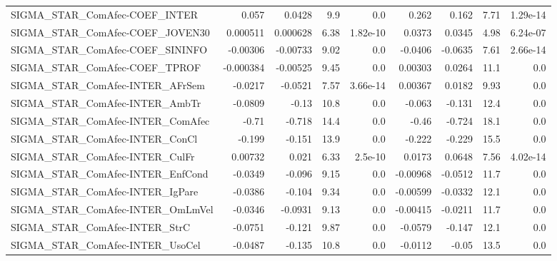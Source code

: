 \begin{tabular}{lrrrrrrrr}
SIGMA\_STAR\_ComAfec-COEF\_INTER          &       0.057 &       0.0428 &      9.9 &      0.0 &      0.262 &       0.162 &         7.71 &      1.29e-14 \\
SIGMA\_STAR\_ComAfec-COEF\_JOVEN30        &    0.000511 &     0.000628 &     6.38 & 1.82e-10 &     0.0373 &      0.0345 &         4.98 &      6.24e-07 \\
SIGMA\_STAR\_ComAfec-COEF\_SININFO        &    -0.00306 &     -0.00733 &     9.02 &      0.0 &    -0.0406 &     -0.0635 &         7.61 &      2.66e-14 \\
SIGMA\_STAR\_ComAfec-COEF\_TPROF          &   -0.000384 &     -0.00525 &     9.45 &      0.0 &    0.00303 &      0.0264 &         11.1 &           0.0 \\
SIGMA\_STAR\_ComAfec-INTER\_AFrSem        &     -0.0217 &      -0.0521 &     7.57 & 3.66e-14 &    0.00367 &      0.0182 &         9.93 &           0.0 \\
SIGMA\_STAR\_ComAfec-INTER\_AmbTr         &     -0.0809 &        -0.13 &     10.8 &      0.0 &     -0.063 &      -0.131 &         12.4 &           0.0 \\
SIGMA\_STAR\_ComAfec-INTER\_ComAfec       &       -0.71 &       -0.718 &     14.4 &      0.0 &      -0.46 &      -0.724 &         18.1 &           0.0 \\
SIGMA\_STAR\_ComAfec-INTER\_ConCl         &      -0.199 &       -0.151 &     13.9 &      0.0 &     -0.222 &      -0.229 &         15.5 &           0.0 \\
SIGMA\_STAR\_ComAfec-INTER\_CulFr         &     0.00732 &        0.021 &     6.33 &  2.5e-10 &     0.0173 &      0.0648 &         7.56 &      4.02e-14 \\
SIGMA\_STAR\_ComAfec-INTER\_EnfCond       &     -0.0349 &       -0.096 &     9.15 &      0.0 &   -0.00968 &     -0.0512 &         11.7 &           0.0 \\
SIGMA\_STAR\_ComAfec-INTER\_IgPare        &     -0.0386 &       -0.104 &     9.34 &      0.0 &   -0.00599 &     -0.0332 &         12.1 &           0.0 \\
SIGMA\_STAR\_ComAfec-INTER\_OmLmVel       &     -0.0346 &      -0.0931 &     9.13 &      0.0 &   -0.00415 &     -0.0211 &         11.7 &           0.0 \\
SIGMA\_STAR\_ComAfec-INTER\_StrC          &     -0.0751 &       -0.121 &     9.87 &      0.0 &    -0.0579 &      -0.147 &         12.1 &           0.0 \\
SIGMA\_STAR\_ComAfec-INTER\_UsoCel        &     -0.0487 &       -0.135 &     10.8 &      0.0 &    -0.0112 &       -0.05 &         13.5 &           0.0 \\

\end{tabular}
